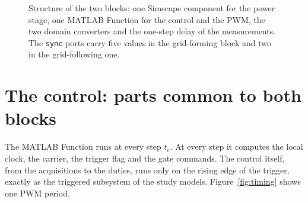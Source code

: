 \documentclass[11pt,a4paper]{scrartcl}
\newcommand{\ped}[1]{_{\mathrm{#1}}}
\newcommand{\code}[1]{\texttt{#1}}
\begin{document}
\begin{onehalfspace}
\begin{figure}[H]
	\captionsetup{width=0.85\textwidth, font=small}
	\caption[Structure of the blocks.]{Structure of the two blocks: one Simscape component for the power stage, one MATLAB Function for the control and the PWM, the two domain converters and the one-step delay of the measurements. The \code{sync} ports carry five values in the grid-forming block and two in the grid-following one.}
	\label{fig:block}
\end{figure}

\section{The control: parts common to both blocks}
\label{sec:common}

The MATLAB Function runs at every step $t\ped{c}$. At every step it computes the local clock, the carrier, the trigger flag and the gate commands. The control itself, from the acquisitions to the duties, runs only on the rising edge of the trigger, exactly as the triggered subsystem of the study models. Figure~\ref{fig:timing} shows one PWM period.


\end{onehalfspace}
\end{document}
